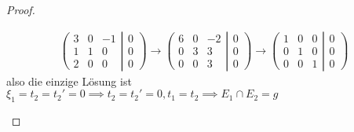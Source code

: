\begin{proof}
\begin{parts}
\begin{gather*}
	\left( \begin{matrix} 3 & 0 & -1 \\ 1 & 1 & 0 \\ 2 & 0 & 0\end{matrix}\right|\left.\begin{matrix}0 \\ 0 \\ 0\end{matrix}  \right)\to \left(\begin{matrix}6 & 0 & -2\\0 & 3 & 3\\0 & 0 & 3\end{matrix}\right|\left.\begin{matrix}0 \\ 0 \\ 0\end{matrix}\right)\to \left(\begin{matrix} 1 & 0 & 0 \\ 0 & 1 & 0 \\ 0 & 0 & 1\end{matrix}\right|\left. \begin{matrix}0 \\ 0 \\ 0\end{matrix}\right)
\end{gather*}
also die einzige Lösung ist $\xi_1=t_2=t_2'=0 \implies t_2=t_2'=0,t_1=t_2\implies E_1\cap E_2=g$ 


\end{parts}
\end{proof}
